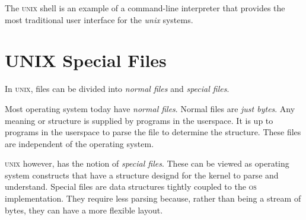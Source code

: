 The \textsc{unix} shell is an example of a command-line interpreter 
that provides the most traditional user interface for the \textit{unix} systems. 




\section{UNIX Special Files}


In \textsc{unix}, files can be divided into \textit{normal files} 
and \textit{special files}.


\begin{figure}[h]
\end{figure}

Most operating system today have \textit{normal files}.
Normal files are \textit{just bytes}. Any meaning or structure 
is supplied by programs in the userspace. 
It is up to programs in the userspace to parse the file 
to determine the structure.
These files are independent of the operating system.

\textsc{unix} however, has the notion of \textit{special files}.
These can be viewed as operating system constructs that 
have a structure designd for the kernel to parse and understand. 
Special files are data structures tightly coupled to 
the \textsc{os} implementation. They require less parsing 
because, rather than being a stream of bytes, they can have a more 
flexible layout. 

